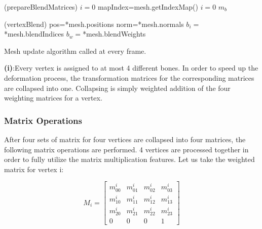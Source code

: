 \begin{algorithm}
\dontprintsemicolon %
\function(prepareBlendMatrices){
$i=0$\;
mapIndex=mesh.getIndexMap() \;
$i=0$\;
\Return $m_b$\;
}

\function(vertexBlend){
pos=*mesh.positions\;
norm=*mesh.normals\;
$b_i=$*mesh.blendIndices\;
$b_w=$*mesh.blendWeights\;
}
\caption{Mesh update algorithm called at every frame.}
\label{algo:updateMesh}
\end{algorithm}

{\bf (i)}:Every vertex is assigned to at most 4 different bones.
In order to speed up the deformation process, the transformation matrices for the corresponding matrices are collapsed into one. Collapsing is simply weighted addition of the four weighting matrices for a vertex.

\subsubsection{Matrix Operations}
After four sets of matrix for four vertices are collapsed into four matrices, the following matrix operations are performed. 4 vertices are processed together in order to fully utilize the matrix multiplication features.
Let us take the weighted matrix for vertex i:

\begin{equation}
M_i=
\begin{bmatrix}
m_{00}^i & m_{01}^i & m_{02}^i & m_{03}^i \\
m_{10}^i & m_{11}^i & m_{12}^i & m_{13}^i \\
m_{20}^i & m_{21}^i & m_{22}^i & m_{23}^i \\
0 & 0 & 0 & 1
\end{bmatrix}
\label{eqn:weighted_matrix_for_i}
\end{equation}

